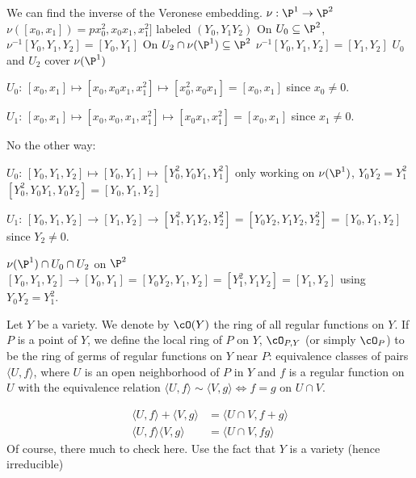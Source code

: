 \begin{ex}
We can find the inverse of the Veronese embedding. $\nu: \P^1 \to \P^2$
$\nu([x_0,x_1])= px_0^2,x_0x_1,x_1^2]$ labeled $(Y_0,Y_1Y_2)$
On $U_0 \subseteq \P^2$, 
$\nu^{-1}[Y_0,Y_1,Y_2]= [Y_0,Y_1]$
On $U_2 \cap \nu(\P^1) \subseteq \P^2$
$\nu^{-1}[Y_0,Y_1,Y_2]= [Y_1,Y_2]$
$U_0$ and $U_2$ cover $\nu(\P^1)$

$U_0$: $[x_0,x_1] \mapsto [x_0,x_0x_1,x_1^2] \mapsto [x_0^2,x_0x_1]= [x_0,x_1]$ since $x_0 \neq 0$. 

$U_1$: $[x_0,x_1] \mapsto [x_0,x_0,x_1,x_1^2] \mapsto [x_0x_1,x_1^2]= [x_0,x_1]$ since $x_1 \neq 0$. 


No the other way:

$U_0$: $[Y_0,Y_1,Y_2] \mapsto [Y_0,Y_1] \mapsto [Y_0^2,Y_0Y_1,Y_1^2]$ only working on $\nu(\P^1)$, $Y_0Y_2= Y_1^2$
$[Y_0^2,Y_0Y_1,Y_0Y_2]= [Y_0,Y_1,Y_2]$

$U_1$: $[Y_0,Y_1,Y_2] \to [Y_1,Y_2] \to [Y_1^2,Y_1Y_2,Y_2^2]= [Y_0Y_2,Y_1Y_2,Y_2^2]= [Y_0,Y_1,Y_2]$ since $Y_2 \neq 0$. 

$\nu(\P^1) \cap U_0 \cap U_2$ on $\P^2$
$[Y_0,Y_1,Y_2] \to [Y_0,Y_1]= [Y_0Y_2,Y_1,Y_2]= [Y_1^2,Y_1Y_2] = [Y_1,Y_2]$ using $Y_0Y_2=Y_1^2$. 
\end{ex}


\begin{dfn}
Let $Y$ be a variety. We denote by $\cO(Y)$ the ring of all regular functions on $Y$. If $P$ is a point of $Y$, we define the local ring of $P$ on $Y$, $\cO_{P,Y}$ (or simply $\cO_P$) to be the ring of germs of regular functions on $Y$ near $P$: equivalence classes of pairs $\langle U,f \rangle$, where $U$ is an open neighborhood of $P$ in $Y$ and $f$ is a regular function on $U$ with the equivalence relation $\langle U,f \rangle \sim \langle V,g \rangle \Leftrightarrow f=g \text{ on } U \cap V$.
\end{dfn}

	\[
	\begin{split}
	\langle U,f \rangle + \langle V,g \rangle&= \langle U \cap V, f+g \rangle \\
	\langle U,f \rangle \langle V,g \rangle&= \langle U \cap V, fg \rangle 
	\end{split}
	\]
Of course, there much to check here. Use the fact that $Y$ is a variety (hence irreducible)





































